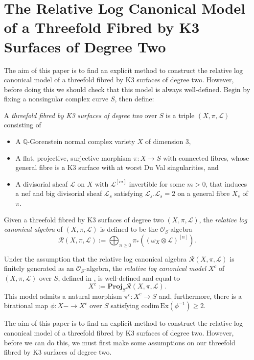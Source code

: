 \documentclass{amsart}
\begin{document}
\section{The Relative Log Canonical Model of a Threefold Fibred by K3 Surfaces of Degree Two}\label{relsect}

The aim of this paper is to find an explicit method to construct the relative log canonical model of a threefold fibred by K3 surfaces of degree two. However, before doing this we should check that this model is always well-defined. Begin by fixing a nonsingular complex curve $S$, then define:

\begin{defn} A \emph{threefold fibred by K3 surfaces of degree two} over $S$ is a triple $(X,\pi,{\mathcal{L}})$ consisting of
\begin{itemize} 
\item A ${\mathbb{Q}}$-Gorenstein normal complex variety $X$ of dimension $3$,
\item A flat, projective, surjective morphism $\pi\colon X \to S$ with connected fibres, whose general fibre is a K3 surface with at worst Du Val singularities, and
\item A divisorial sheaf ${\mathcal{L}}$ on $X$ with ${\mathcal{L}}^{[m]}$ invertible for some $m > 0$, that induces a nef and big divisorial sheaf ${\mathcal{L}}_s$ satisfying ${\mathcal{L}}_s.{\mathcal{L}}_s = 2$ on a general fibre $X_s$ of $\pi$.
\end{itemize}
\end{defn}

Given a threefold fibred by K3 surfaces of degree two $(X,\pi,{\mathcal{L}})$, the \emph{relative log canonical algebra} of $(X,\pi,{\mathcal{L}})$ is defined to be the ${\mathcal{O}}_S$-algebra
\[ {\mathcal{R}}(X,\pi,{\mathcal{L}}) := \bigoplus_{n \geq 0} \pi_*((\omega_X \otimes {\mathcal{L}})^{[n]}).\]

Under the assumption that the relative log canonical algebra ${\mathcal{R}}(X,\pi,{\mathcal{L}})$ is finitely generated as an ${\mathcal{O}}_S$-algebra, the \emph{relative log canonical model} $X^c$ of $(X,\pi,{\mathcal{L}})$ over $S$, defined in \cite[Section 3.8]{bgav}, is well-defined and equal to
\[ X^c := \mathbf{Proj}_S {\mathcal{R}}(X,\pi,{\mathcal{L}}).\]
This model admits a natural morphism $\pi^c\colon X^c \to S$ and, furthermore, there is a birational map $\phi\colon X - \to X^c$ over $S$ satisfying $\mathrm{codim}\, \mathrm{Ex}(\phi^{-1}) \geq 2$.

The aim of this paper is to find an explicit method to construct the relative log canonical model of a threefold fibred by K3 surfaces of degree two. However, before we can do this, we must first make some assumptions on our threefold fibred by K3 surfaces of degree two.
\end{document}
